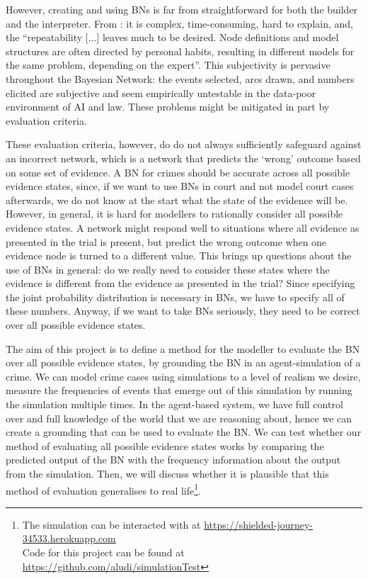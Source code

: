 \documentclass[12pt]{article}
\begin{document}
However, creating and using BNs is far from straightforward for both the builder and the interpreter. From \citet{deKoeijer2020}: it is complex, time-consuming, hard to explain, and, the ``repeatability [...] leaves much to be desired. Node definitions and model structures are often directed by personal habits, resulting in different models for the same problem, depending on the expert''. This subjectivity is pervasive throughout the Bayesian Network: the events selected, arcs drawn, and numbers elicited are subjective and seem empirically untestable in the data-poor environment of AI and law. These problems might be mitigated in part by evaluation criteria. 

These evaluation criteria, however, do do not always sufficiently safeguard against an incorrect network, which is a network that predicts the `wrong' outcome based on some set of evidence. A BN for crimes should be accurate across all possible evidence states, since, if we want to use BNs in court and not model court cases afterwards, we do not know at the start what the state of the evidence will be. However, in general, it is hard for modellers to rationally consider all possible evidence states. A network might respond well to situations where all evidence as presented in the trial is present, but predict the wrong outcome when one evidence node is turned to a different value. This brings up questions about the use of BNs in general: do we really need to consider these states where the evidence is different from the evidence as presented in the trial? Since specifying the joint probability distribution is necessary in BNs, we have to specify all of these numbers. Anyway, if we want to take BNs seriously, they need to be correct over all possible evidence states.

 The aim of this project is to define a method for the modeller to evaluate the BN over all possible evidence states, by grounding the BN in an agent-simulation of a crime. We can model crime cases using simulations to a level of realism we desire, measure the frequencies of events that emerge out of this simulation by running the simulation multiple times. In the agent-based system, we have full control over and full knowledge of the world that we are reasoning about, hence we can create a grounding that can be used to evaluate the BN. We can test whether our method of evaluating all possible evidence states works by comparing the predicted output of the BN with the frequency information about the output from the simulation. Then, we will discuss whether it is plausible that this method of evaluation generalises to real life\footnote{The simulation can be interacted with at \url{https://shielded-journey-34533.herokuapp.com} \\ Code for this project can be found at \url{https://github.com/aludi/simulationTest}}.
 
\end{document}
